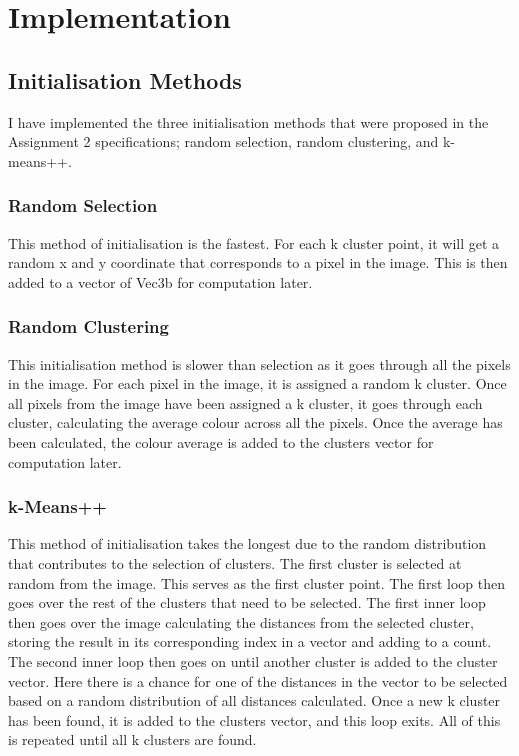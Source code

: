 \documentclass{article}
\begin{document}

\section{Implementation}

\subsection{Initialisation Methods}
I have implemented the three initialisation methods that were proposed in the
Assignment 2 specifications; random selection, random clustering, and k-means++.

\subsubsection{Random Selection}
This method of initialisation is the fastest. For each k cluster point, it will
get a random x and y coordinate that corresponds to a pixel in the image. This
is then added to a vector of Vec3b for computation later.

\subsubsection{Random Clustering}
This initialisation method is slower than selection as it goes through all the
pixels in the image. For each pixel in the image, it is assigned a random k
cluster. Once all pixels from the image have been assigned a k cluster, it goes
through each cluster, calculating the average colour across all the pixels. Once
the average has been calculated, the colour average is added to the clusters
vector for computation later.

\subsubsection{k-Means++}
This method of initialisation takes the longest due to the random distribution
that contributes to the selection of clusters. The first cluster is selected at
random from the image. This serves as the first cluster point. The first loop
then goes over the rest of the clusters that need to be selected. The first
inner loop then goes over the image calculating the distances from the selected
cluster, storing the result in its corresponding index in a vector and adding to
a count. The second inner loop then goes on until another cluster is added to
the cluster vector. Here there is a chance for one of the distances in the
vector to be selected based on a random distribution of all distances
calculated. Once a new k cluster has been found, it is added to the clusters
vector, and this loop exits. All of this is repeated until all k clusters are
found.
\end{document}
